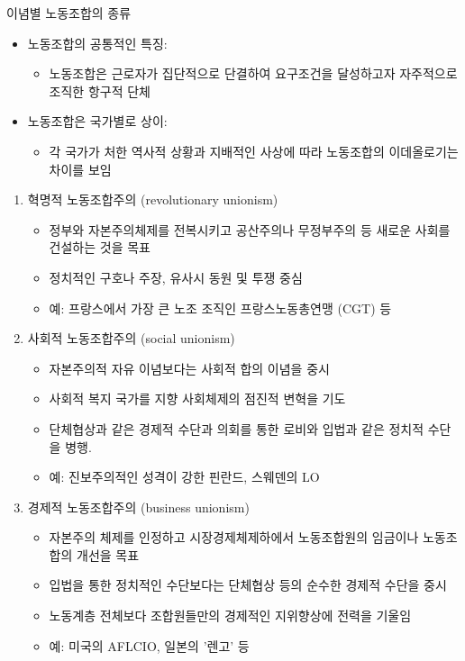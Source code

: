 \documentclass[aspectratio=169,xcolor=dvipsnames,handout]{beamer}
\begin{document}
\begin{frame}[allowframebreaks]{이념별 노동조합의 종류}
    \begin{itemize}
        \item 노동조합의 공통적인 특징: 
        \begin{itemize}[<+->]
            \item 노동조합은 근로자가 집단적으로 단결하여 요구조건을 달성하고자 자주적으로 조직한 항구적 단체
        \end{itemize}
        \item 노동조합은 국가별로 상이:
        \begin{itemize}[<+->]
            \item 각 국가가 처한 역사적 상황과 지배적인 사상에 따라 노동조합의 이데올로기는 차이를 보임
        \end{itemize}
    \end{itemize}
    \framebreak\relax
    \begin{enumerate}
        \item 혁명적 노동조합주의 (revolutionary unionism)
        \begin{itemize}[<+->]
            \item 정부와 자본주의체제를 전복시키고 공산주의나 무정부주의 등 새로운 사회를 건설하는 것을 목표
            \item 정치적인 구호나 주장, 유사시 동원 및 투쟁 중심
            \item 예: 프랑스에서 가장 큰 노조 조직인 프랑스노동총연맹 (CGT) 등
        \end{itemize}
        \framebreak\relax
        \item 사회적 노동조합주의 (social unionism)
        \begin{itemize}[<+->]
            \item 자본주의적 자유 이념보다는 사회적 합의 이념을 중시 
            \item 사회적 복지 국가를 지향 사회체제의 점진적 변혁을 기도
            \item 단체협상과 같은 경제적 수단과 의회를 통한 로비와 입법과 같은 정치적 수단을 병행.
            \item 예: 진보주의적인 성격이 강한 핀란드, 스웨덴의 LO
        \end{itemize}
        \framebreak\relax
        \item 경제적 노동조합주의 (business unionism)
        \begin{itemize}[<+->]
            \item 자본주의 체제를 인정하고 시장경제체제하에서 노동조합원의 임금이나 노동조합의 개선을 목표 
            \item 입법을 통한 정치적인 수단보다는 단체협상 등의 순수한 경제적 수단을 중시
            \item 노동계층 전체보다 조합원들만의 경제적인 지위향상에 전력을 기울임
            \item 예: 미국의 AFLCIO, 일본의 '렌고' 등
        \end{itemize}
    \end{enumerate}
\end{frame}
\end{document}
